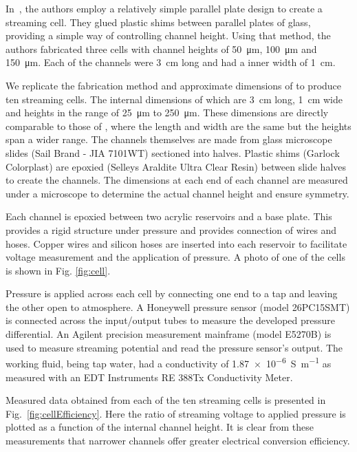 \documentclass[10pt,final,journal]{IEEEtran}
\begin{document}
    In~\cite{Gu2000}, the authors employ a relatively simple parallel plate design to create a streaming cell.
    They glued plastic shims between parallel plates of glass, providing a simple way of controlling channel height.
    Using that method, the authors fabricated three cells with channel heights of \SI{50}{\micro\metre}, \SI{100}{\micro\metre} and \SI{150}{\micro\metre}.
    Each of the channels were \SI{3}{\centi\metre} long and had a inner width of \SI{1}{\centi\metre}.

    We replicate the fabrication method and approximate dimensions of \cite{Gu2000} to produce ten streaming cells.
    The internal dimensions of which are \SI{3}{\centi\metre} long, \SI{1}{\centi\metre} wide and heights in the range of \SI{25}{\micro\metre} to \SI{250}{\micro\metre}.
    These dimensions are directly comparable to those of \cite{Gu2000}, where the length and width are the same but the heights span a wider range.
    The channels themselves are made from glass microscope slides (Sail Brand - JIA 7101WT) sectioned into halves.
    Plastic shims (Garlock Colorplast) are epoxied (Selleys Araldite Ultra Clear Resin) between slide halves to create the channels.
    The dimensions at each end of each channel are measured under a microscope to determine the actual channel height and ensure symmetry.

    Each channel is epoxied between two acrylic reservoirs and a base plate.
    This provides a rigid structure under pressure and provides connection of wires and hoses.
    Copper wires and silicon hoses are inserted into each reservoir to facilitate voltage measurement and the application of pressure.
    A photo of one of the cells is shown in Fig. \ref{fig:cell}.

    Pressure is applied across each cell by connecting one end to a tap and leaving the other open to atmosphere.
    A Honeywell pressure sensor (model 26PC15SMT) is connected across the input/output tubes to measure the developed pressure differential.
    An Agilent precision measurement mainframe (model E5270B) is used to measure streaming potential and read the pressure sensor's output.
    The working fluid, being tap water, had a conductivity of \SI{1.87e-6}{\siemens\per\meter} as measured with an EDT Instruments RE 388Tx Conductivity Meter.

    Measured data obtained from each of the ten streaming cells is presented in Fig.~\ref{fig:cellEfficiency}.
    Here the ratio of streaming voltage to applied pressure is plotted as a function of the internal channel height.
    It is clear from these measurements that narrower channels offer greater electrical conversion efficiency.
\end{document}
